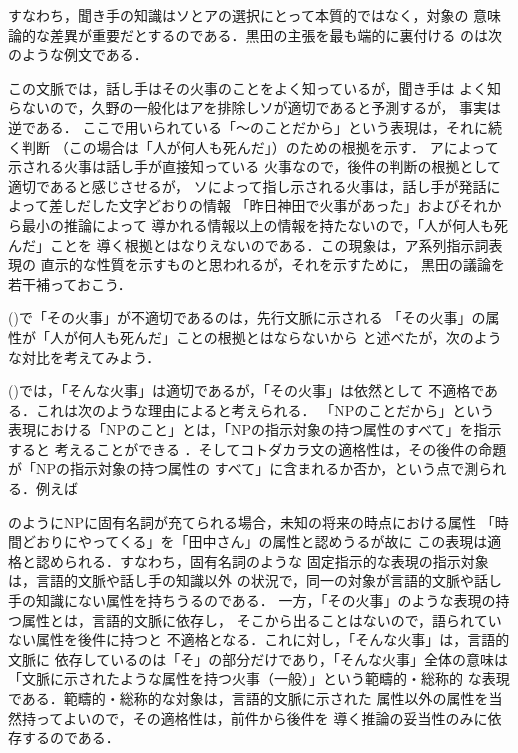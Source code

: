 すなわち，聞き手の知識はソとアの選択にとって本質的ではなく，対象の
意味論的な差異が重要だとするのである．黒田の主張を最も端的に裏付ける
のは次のような例文である．


この文脈では，話し手はその火事のことをよく知っているが，聞き手は
よく知らないので，久野の一般化はアを排除しソが適切であると予測するが，
事実は逆である．
ここで用いられている「〜のことだから」という表現は，それに続く判断
（この場合は「人が何人も死んだ」）のための根拠を示す．
アによって示される火事は話し手が直接知っている
火事なので，後件の判断の根拠として適切であると感じさせるが，
ソによって指し示される火事は，話し手が発話によって差しだした文字どおりの情報
「昨日神田で火事があった」およびそれから最小の推論によって
導かれる情報以上の情報を持たないので，「人が何人も死んだ」ことを
導く根拠とはなりえないのである．この現象は，ア系列指示詞表現の
直示的な性質を示すものと思われるが，それを示すために，
黒田の議論を若干補っておこう．

()で「その火事」が不適切であるのは，先行文脈に示される
「その火事」の属性が「人が何人も死んだ」ことの根拠とはならないから
と述べたが，次のような対比を考えてみよう．


()では，「そんな火事」は適切であるが，「その火事」は依然として
不適格である．これは次のような理由によると考えられる．
「NPのことだから」という
表現における「NPのこと」とは，「NPの指示対象の持つ属性のすべて」を指示すると
考えることができる
．そしてコトダカラ文の適格性は，その後件の命題が「NPの指示対象の持つ属性の
すべて」に含まれるか否か，という点で測られる．例えば

のようにNPに固有名詞が充てられる場合，未知の将来の時点における属性
「時間どおりにやってくる」を「田中さん」の属性と認めうるが故に
この表現は適格と認められる．すなわち，固有名詞のような
固定指示的な表現の指示対象は，言語的文脈や話し手の知識以外
の状況で，同一の対象が言語的文脈や話し手の知識にない属性を持ちうるのである．
一方，「その火事」のような表現の持つ属性とは，言語的文脈に依存し，
そこから出ることはないので，語られていない属性を後件に持つと
不適格となる．これに対し，「そんな火事」は，言語的文脈に
依存しているのは「そ」の部分だけであり，「そんな火事」全体の意味は
「文脈に示されたような属性を持つ火事（一般）」という範疇的・総称的
な表現である．範疇的・総称的な対象は，言語的文脈に示された
属性以外の属性を当然持ってよいので，その適格性は，前件から後件を
導く推論の妥当性のみに依存するのである．

